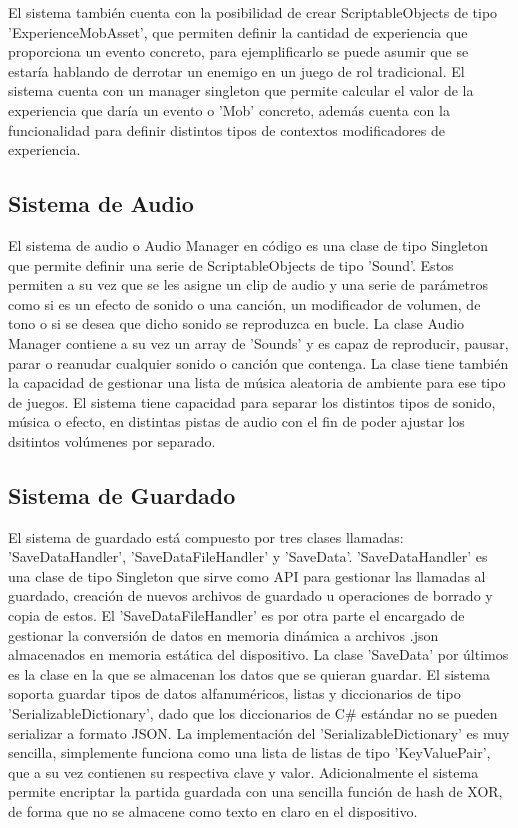 El sistema también cuenta con la posibilidad de crear ScriptableObjects de tipo 'ExperienceMobAsset', que permiten definir la cantidad de experiencia que proporciona un evento 
 concreto, para ejemplificarlo se puede asumir que se estaría hablando de derrotar un enemigo en un juego de rol tradicional. El sistema cuenta con un manager singleton que 
 permite calcular el valor de la experiencia que daría un evento o 'Mob' concreto, además cuenta con la funcionalidad para definir distintos tipos de contextos modificadores 
 de experiencia.


\subsection{Sistema de Audio}
El sistema de audio o Audio Manager en código es una clase de tipo Singleton que permite definir una serie de ScriptableObjects de tipo 'Sound'. Estos permiten a su vez que 
se les asigne un clip de audio y una serie de parámetros como si es un efecto de sonido o una canción, un modificador de volumen, de tono o si se desea que dicho sonido 
se reproduzca en bucle. La clase Audio Manager contiene a su vez un array de 'Sounds' y es capaz de reproducir, pausar, parar o reanudar cualquier sonido o canción que contenga. 
La clase tiene también la capacidad de gestionar una lista de música aleatoria de ambiente para ese tipo de juegos. El sistema tiene capacidad para separar los distintos tipos de 
sonido, música o efecto, en distintas pistas de audio con el fin de poder ajustar los dsitintos volúmenes por separado.    

\subsection{Sistema de Guardado}
El sistema de guardado está compuesto por tres clases llamadas: 'SaveDataHandler', 'SaveDataFileHandler' y 'SaveData'. 'SaveDataHandler' es una clase de tipo Singleton que 
sirve como API para gestionar las llamadas al guardado, creación de nuevos archivos de guardado u operaciones de borrado y copia de estos. El 'SaveDataFileHandler' es por 
otra parte el encargado de gestionar la conversión de datos en memoria dinámica a archivos .json almacenados en memoria estática del dispositivo. La clase 'SaveData' por últimos
es la clase en la que se almacenan los datos que se quieran guardar. El sistema soporta guardar tipos de datos alfanuméricos, listas y diccionarios de tipo 
'SerializableDictionary', dado que los diccionarios de C\# estándar no se pueden serializar a formato JSON. La implementación del 'SerializableDictionary' es muy sencilla, 
simplemente funciona como una lista de listas de tipo 'KeyValuePair', que a su vez contienen su respectiva clave y valor. Adicionalmente el sistema permite encriptar la 
partida guardada con una sencilla función de hash de XOR, de forma que no se almacene como texto en claro en el dispositivo.  

